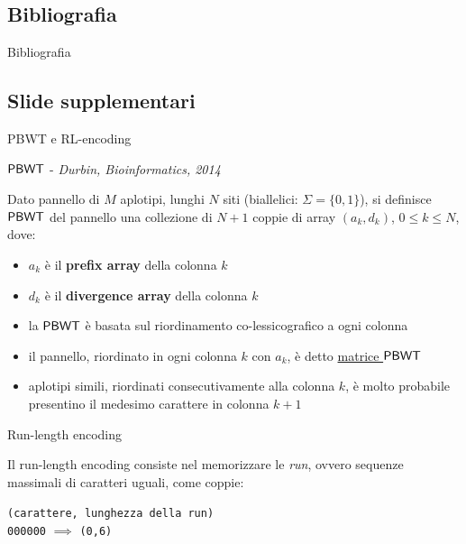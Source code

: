 \documentclass[]{beamer}
\def\PBWT{\mbox{\rm {\sf PBWT}}}
\begin{document}
\subsection{Bibliografia}
\nocite{*}
\begin{frame}[plain]{Bibliografia}
  \nocite{*}
  
  
\end{frame}
  
\subsection{Slide supplementari}
\begin{frame}[plain]{PBWT e RL-encoding}
  \begin{block}{$\PBWT$ - {\footnotesize{\textit{Durbin, Bioinformatics,
            2014}}}} 
    \footnotesize{ Dato pannello di $M$ aplotipi, lunghi $N$ siti (biallelici:
      $\Sigma=\{0,1\}$), si definisce 
      $\PBWT$ del 
      pannello una collezione di $N+1$ coppie di array $(a_k,d_k)$, $0\leq k\leq
      N$, dove:
      \begin{itemize}
        \item $a_k$ è il \textbf{prefix array} della colonna $k$
        \item $d_k$ è il \textbf{divergence array} della colonna $k$
      \end{itemize}}
  \end{block}
  \begin{block}{}
    \footnotesize{\begin{itemize}
        \item la $\PBWT$ è basata sul riordinamento co-lessicografico a ogni
        colonna
        \item il pannello, riordinato in ogni colonna $k$ con $a_k$, è detto
        \underline{matrice $\PBWT$}
        \item aplotipi simili, riordinati consecutivamente alla colonna $k$, è
        molto probabile presentino il medesimo carattere in colonna $k+1$
      \end{itemize}}
  \end{block}
  
  \begin{block}{Run-length encoding}
    \footnotesize{Il run-length encoding consiste nel memorizzare le \textit{run}, ovvero
      sequenze massimali di caratteri uguali, come coppie: \\
      \vspace{-0.3cm}
      \begin{center}
        \texttt{(carattere, lunghezza della run)}\\
        \texttt{000000} $\implies$ \texttt{(0,6)}
      \end{center}}
  \end{block}
\end{frame}
\end{document}

